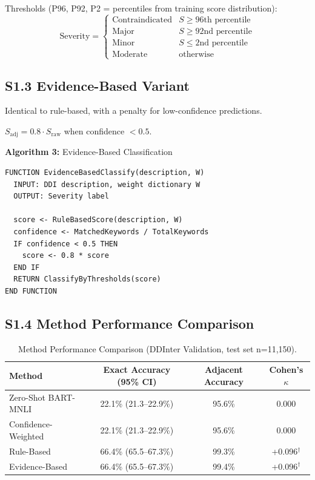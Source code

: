 \documentclass[12pt,a4paper]{article}
\begin{document}
\medskip
\noindent Thresholds (P96, P92, P2 = percentiles from training score distribution):
\[
\text{Severity} = 
\begin{cases}
\text{Contraindicated} & S \geq 96\text{th percentile} \\
\text{Major} & S \geq 92\text{nd percentile} \\
\text{Minor} & S \leq 2\text{nd percentile} \\
\text{Moderate} & \text{otherwise}
\end{cases}
\]

\subsection{S1.3 Evidence-Based Variant}

Identical to rule-based, with a penalty for low-confidence predictions.

$S_{\text{adj}} = 0.8 \cdot S_{\text{raw}}$ when confidence $< 0.5$.

\medskip
\noindent\textbf{Algorithm 3:} Evidence-Based Classification
\begin{verbatim}
FUNCTION EvidenceBasedClassify(description, W)
  INPUT: DDI description, weight dictionary W
  OUTPUT: Severity label
  
  score <- RuleBasedScore(description, W)
  confidence <- MatchedKeywords / TotalKeywords
  IF confidence < 0.5 THEN
    score <- 0.8 * score
  END IF
  RETURN ClassifyByThresholds(score)
END FUNCTION
\end{verbatim}

\subsection{S1.4 Method Performance Comparison}

\begin{table}[H]
\centering
\caption{Method Performance Comparison (DDInter Validation, test set n=11,150).}
\label{tab:method_performance}
\begin{tabular}{@{}lccc@{}}
\toprule
\textbf{Method} & \textbf{Exact Accuracy (95\% CI)} & \textbf{Adjacent Accuracy} & \textbf{Cohen's $\kappa$} \\
\midrule
Zero-Shot BART-MNLI & 22.1\% (21.3--22.9\%) & 95.6\% & 0.000 \\
Confidence-Weighted & 22.1\% (21.3--22.9\%) & 95.6\% & 0.000 \\
Rule-Based & 66.4\% (65.5--67.3\%) & 99.3\% & +0.096$^\dagger$ \\
Evidence-Based & 66.4\% (65.5--67.3\%) & 99.4\% & +0.096$^\dagger$ \\
\bottomrule
\end{tabular}
\end{table}
\end{document}
